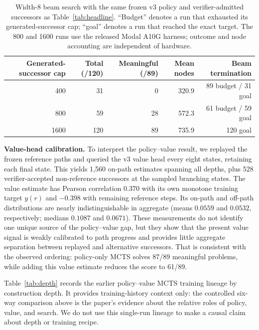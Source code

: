 \documentclass[11pt]{article}
\numberwithin{equation}{section}
\begin{document}
\begin{table}[htbp]
\centering
\small
\begin{tabular}{@{}rrrrr@{}}
\toprule
Generated-successor cap & Total (/120) & Meaningful (/89) & Mean nodes & Beam termination \\
\midrule
400  & 31  & 0  & 320.9 & 89 budget / 31 goal \\
800  & 59  & 28 & 572.3 & 61 budget / 59 goal \\
1600 & 120 & 89 & 735.9 & 120 goal \\
\bottomrule
\end{tabular}
\caption{Width-8 beam search with the same frozen v3 policy and verifier-admitted successors as Table~\ref{tab:headline}. ``Budget'' denotes a run that exhausted its generated-successor cap; ``goal'' denotes a run that reached the exact target. The 800 and 1600 runs use the released Modal A10G harness; outcome and node accounting are independent of hardware.}
\label{tab:beam-budget}
\end{table}

\textbf{Value-head calibration.} To interpret the policy--value result, we replayed the frozen reference paths and queried the v3 value head every eight states, retaining each final state. This yields 1{,}560 on-path estimates spanning all depths, plus 528 verifier-accepted non-reference successors at the sampled branching states. The value estimate has Pearson correlation $0.370$ with its own monotone training target $y(r)$ and $-0.398$ with remaining reference steps. Its on-path and off-path distributions are nearly indistinguishable in aggregate (means $0.0559$ and $0.0532$, respectively; medians $0.1087$ and $0.0671$). These measurements do not identify one unique source of the policy--value gap, but they show that the present value signal is weakly calibrated to path progress and provides little aggregate separation between replayed and alternative successors. That is consistent with the observed ordering: policy-only MCTS solves 87/89 meaningful problems, while adding this value estimate reduces the score to 61/89.

Table~\ref{tab:depth} records the earlier policy--value MCTS training lineage by construction depth. It provides training-history context only: the controlled six-way comparison above is the paper's evidence about the relative roles of policy, value, and search. We do not use this single-run lineage to make a causal claim about depth or training recipe.
\end{document}
